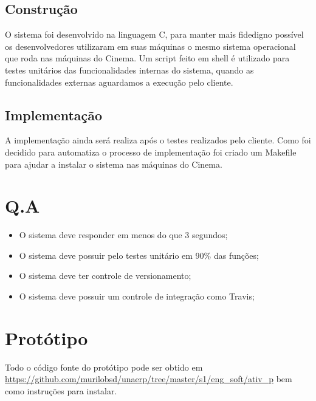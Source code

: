 \documentclass[12pt,a4paper]{article}
\let\oldsection\section
\renewcommand\section{\clearpage\oldsection}
\begin{document}
\subsection{Construção}
O sistema foi desenvolvido na linguagem C, para manter mais fidedigno possível
os desenvolvedores utilizaram em suas máquinas o mesmo sistema operacional que 
roda nas máquinas do Cinema. Um script feito em shell é utilizado para testes
unitários das funcionalidades internas do sistema, quando as funcionalidades
externas aguardamos a execução pelo cliente.


\subsection{Implementação}
A implementação ainda será realiza após o testes realizados pelo cliente. Como
foi decidido para automatiza o processo de implementação foi criado um Makefile
para ajudar a instalar o sistema nas máquinas do Cinema.


\section{Q.A}
\begin{itemize}
	\item O sistema deve responder em menos do que 3 segundos;
	\item O sistema deve possuir pelo testes unitário em 90\% das funções;
	\item O sistema deve ter controle de versionamento;
	\item O sistema deve possuir um controle de integração como Travis;
\end{itemize}


\section{Protótipo}

Todo o código fonte do protótipo pode ser obtido em \href{https://github.com/murilobsd/unaerp/tree/master/s1/eng\_soft/ativ\_p}{https://github.com/murilobsd/unaerp/tree/master/s1/eng\_soft/ativ\_p} bem como instruções para instalar.
\end{document}
